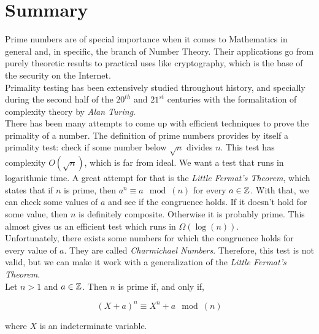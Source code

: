 %

\chapter{Summary}

Prime numbers are of special importance when it comes to Mathematics in general and, in specific, the branch of Number Theory. Their applications go from purely theoretic results to practical uses like cryptography, which is the base of the security on the Internet.\\

Primality testing has been extensively studied throughout history, and specially during the second half of the $20^{th}$ and $21^{st}$ centuries with the formalitation of complexity theory by \textit{Alan Turing}.\\

There has been many attempts to come up with efficient techniques to prove the primality of a number. The definition of prime numbers provides by itself a primality test: check if some number below $\sqrt{n}$ divides $n$. This test has complexity $O(\sqrt{n})$, which is far from ideal. We want a test that runs in logarithmic time. A great attempt for that is the \textit{Little Fermat's Theorem}, which states that if $n$ is prime, then $a^n \equiv a \mod(n)$ for every $a \in \mathbb{Z}$. With that, we can check some values of $a$ and see if the congruence holds. If it doesn't hold for some value, then $n$ is definitely composite. Otherwise it is probably prime. This almost gives us an efficient test which runs in $\Omega(\log(n))$.\\

Unfortunately, there exists some numbers for which the congruence holds for every value of $a$. They are called \textit{Charmichael Numbers}. Therefore, this test is not valid, but we can make it work with a generalization of the \textit{Little Fermat's Theorem}.\\

Let $n > 1$ and $a \in \mathbb{Z}$. Then $n$ is prime if, and only if,

\begin{equation}
(X + a)^n \equiv X^n + a \mod(n)
\end{equation}

where $X$ is an indeterminate variable.\\

